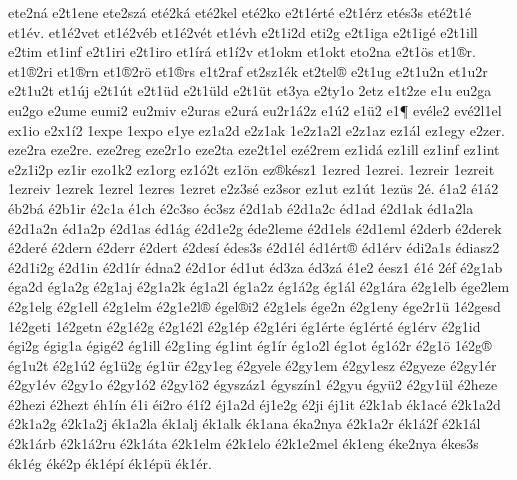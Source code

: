 {ete2n^^e1
e2t1ene
ete2sz^^e1
et^^e92k^^e1
et^^e92kel
et^^e92ko
e2t1^^e9rt^^e9
e2t1^^e9rz
et^^e9s3s
et^^e92t1^^e9
et1^^e9v.
et1^^e92vet
et1^^e92v^^e9b
et1^^e92v^^e9t
et1^^e9vh
e2t1i2d
eti2g
e2t1iga
e2t1ig^^e9
e2t1ill
e2tim
et1inf
e2t1iri
e2t1iro
et1^^edr^^e1
et1^^ed2v
et1okm
et1okt
eto2na
e2t1^^f6s
et1^^aer.
et1^^ae2ri
et1^^aern
et1^^ae2r^^f6
et1^^aers
e1t2raf
et2sz1^^e9k
et2tel^^ae
e2t1ug
e2t1u2n
et1u2r
e2t1u2t
et1^^faj
e2t1^^fat
e2t1^^fcd
e2t1^^fcld
e2t1^^fct
et3ya
e2ty1o
2etz
e1t2ze
e1u
eu2ga
eu2go
e2ume
eumi2
eu2miv
e2uras
e2ur^^e1
eu2r1^^e12z
e1^^fa2
e1^^fc2
e1^^b6
ev^^e9le2
ev^^e92l1el
ex1io
e2x1^^ed2
1expe
1expo
e1ye
ez1a2d
e2z1ak
1e2z1a2l
e2z1az
ez1^^e1l
ez1egy
e2zer.
eze2ra
eze2re.
eze2reg
eze2r1o
eze2ta
eze2t1el
ez^^e92rem
ez1id^^e1
ez1ill
ez1inf
ez1int
e2z1i2p
ez1ir
ezo1k2
ez1org
ez1^^f32t
ez1^^f6n
ez^^aek^^e9sz1
1ezred
1ezrei.
1ezreir
1ezreit
1ezreiv
1ezrek
1ezrel
1ezres
1ezret
e2z3s^^e9
ez3sor
ez1ut
ez1^^fat
1ez^^fcs
2^^e9.
^^e91a2
^^e91^^e12
^^e9b2b^^e1
^^e92b1ir
^^e92c1a
^^e91ch
^^e92c3so
^^e9c3sz
^^e92d1ab
^^e92d1a2c
^^e9d1ad
^^e92d1ak
^^e9d1a2la
^^e92d1a2n
^^e9d1a2p
^^e92d1as
^^e9d1^^e1g
^^e92d1e2g
^^e9de2leme
^^e92d1els
^^e92d1eml
^^e92derb
^^e92derek
^^e92der^^e9
^^e92dern
^^e92derr
^^e92dert
^^e92des^^ed
^^e9des3s
^^e92d1^^e9l
^^e9d1^^e9rt^^ae
^^e9d1^^e9rv
^^e9di2a1s
^^e9diasz2
^^e92d1i2g
^^e92d1in
^^e92d1^^edr
^^e9dna2
^^e92d1or
^^e9d1ut
^^e9d3za
^^e9d3z^^e1
^^e91e2
^^e9esz1
^^e91^^e9
2^^e9f
^^e92g1ab
^^e9ga2d
^^e9g1a2g
^^e92g1aj
^^e92g1a2k
^^e9g1a2l
^^e9g1a2z
^^e9g1^^e12g
^^e9g1^^e1l
^^e92g1^^e1ra
^^e92g1elb
^^e9ge2lem
^^e92g1elg
^^e92g1ell
^^e92g1elm
^^e92g1e2l^^ae
^^e9gel^^aei2
^^e92g1els
^^e9ge2n
^^e92g1eny
^^e9ge2r1^^fc
1^^e92gesd
1^^e92geti
1^^e92getn
^^e92g1^^e92g
^^e92g1^^e92l
^^e92g1^^e9p
^^e92g1^^e9ri
^^e9g1^^e9rte
^^e9g1^^e9rt^^e9
^^e9g1^^e9rv
^^e92g1id
^^e9gi2g
^^e9gig1a
^^e9gig^^e92
^^e9g1ill
^^e92g1ing
^^e9g1int
^^e9g1^^edr
^^e9g1o2l
^^e9g1ot
^^e9g1^^f32r
^^e92g1^^f6
1^^e92g^^ae
^^e9g1u2t
^^e92g1^^fa2
^^e9g1^^fc2g
^^e9g1^^fcr
^^e92gy1eg
^^e92gyele
^^e92gy1em
^^e92gy1esz
^^e92gyeze
^^e92gy1^^e9r
^^e92gy1^^e9v
^^e92gy1o
^^e92gy1^^f32
^^e92gy1^^f62
^^e9gysz^^e1z1
^^e9gysz^^edn1
^^e92gyu
^^e9gy^^fc2
^^e92gy1^^fcl
^^e92heze
^^e92hezi
^^e92hezt
^^e9h1^^edn
^^e91i
^^e9i2ro
^^e91^^ed2
^^e9j1a2d
^^e9j1e2g
^^e92ji
^^e9j1it
^^e92k1ab
^^e9k1ac^^e9
^^e92k1a2d
^^e92k1a2g
^^e92k1a2j
^^e9k1a2la
^^e9k1alj
^^e9k1alk
^^e9k1ana
^^e9ka2nya
^^e92k1a2r
^^e9k1^^e12f
^^e92k1^^e1l
^^e92k1^^e1rb
^^e92k1^^e12ru
^^e92k1^^e1ta
^^e92k1elm
^^e92k1elo
^^e92k1e2mel
^^e9k1eng
^^e9ke2nya
^^e9kes3s
^^e9k1^^e9g
^^e9k^^e92p
^^e9k1^^e9p^^ed
^^e9k1^^e9p^^fc
^^e9k1^^e9r.
}
